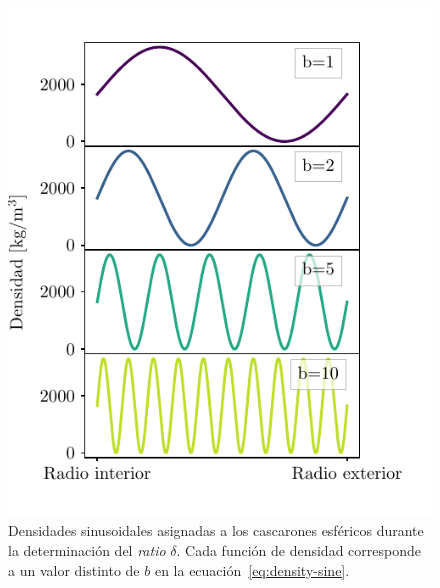 \begin{figure}
\centering
\includegraphics[width=0.5\linewidth]{figs/tesseroids-variable-density/sine-densities.pdf}
\caption{
    Densidades sinusoidales asignadas a los cascarones esféricos durante la
    determinación del \emph{ratio} $\delta$.
    Cada función de densidad corresponde a un valor distinto de $b$ en la
    ecuación~\ref{eq:density-sine}.
}
\label{fig:sine-densities}
\end{figure}

